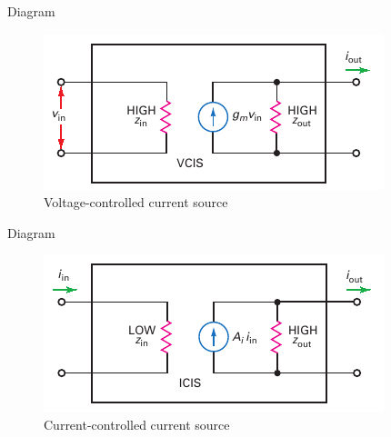 \begin{frame}{Diagram}
	\begin{figure}
		\centering
		\includegraphics[width=0.7\linewidth]{gambar/fig-17.02a}
		\caption{Voltage-controlled current source}
		\label{fig-17.02a}
	\end{figure}
\end{frame}

\begin{frame}{Diagram}
	\begin{figure}
		\centering
		\includegraphics[width=0.7\linewidth]{gambar/fig-17.02b}
		\caption{Current-controlled current source}
		\label{fig-17.02b}
	\end{figure}
\end{frame}